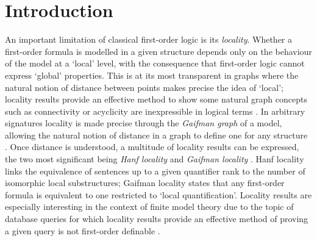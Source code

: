\documentclass{lmcs} %
\newcommand{\?}{\ensuremath{\mkern0.4\thinmuskip}}
\begin{document}
\maketitle


\section{Introduction}\label{sec:Intro}
An important limitation of classical first-order logic is its \textit{locality}. Whether a first-order formula is modelled in a given structure depends only on the behaviour of the model at a `local' level, with the consequence that first-order logic cannot express `global' properties. This is at its most transparent in graphs where the natural notion of distance between points makes precise the idea of `local'; locality results provide an effective method to show some natural graph concepts such as connectivity or acyclicity are inexpressible in logical terms \cite[Section 3.6]{Libkin04:Elementsfinmod}. In arbitrary signatures locality is made precise through the \textit{Gaifman graph} of a model, allowing the natural notion of distance in a graph to define one for any structure \cite[Section 1.4]{EbbinghausFlum95:Finmodeltheory}. Once distance is understood, a multitude of locality results can be expressed, the two most significant being \textit{Hanf locality} \cite{Hanf65:Modeltheory} and \textit{Gaifman locality} \cite{Gaifman81:Local}. Hanf locality links the equivalence of sentences up to a given quantifier rank to the number of isomorphic local substructures; Gaifman locality states that any first-order formula is equivalent to one restricted to `local quantification'. Locality results are especially interesting in the context of finite model theory due to the topic of database queries for which locality results provide an effective method of proving a given query is not first-order definable \cite{Libkin04:Elementsfinmod}. 
\end{document}
